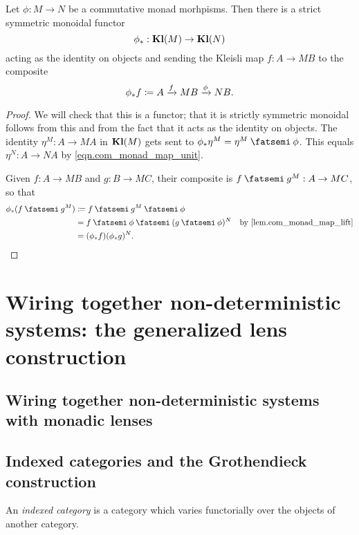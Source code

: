 \documentclass[DynamicalBook]{subfiles}
\begin{document}
\begin{proposition}
  Let $\phi : M \to N$ be a commutative monad morhpisms. Then there is a
  strict symmetric monoidal functor
  $$\phi_{\ast} : \textbf{Kl}(M) \to \textbf{Kl}(N)$$
  acting as the identity on objects and sending the Kleisli map $f : A \to MB$
  to the composite \[\phi_{\ast}f \coloneqq A \xrightarrow{f} M B \xrightarrow{\phi} N B.\]
\end{proposition}
\begin{proof}
  We will check that this is a functor; that it is strictly symmetric monoidal
  follows from this and from the fact that it acts as the identity on objects. 
  The identity $\eta^M : A \to M A$ in $\textbf{Kl}(M)$ gets sent to
  $\phi_{\ast}\eta^M = \eta^M \then \phi$. This equals $\eta^N : A \to NA$ by \cref{eqn.com_monad_map_unit}.

  Given $f : A \to MB$ and $g : B \to MC$, their composite is $f \then g^M : A
  \to M C$, so that
  \begin{align*}
    \phi_{\ast}(f \then g^M) &\coloneqq f \then g^M \then \phi \\
                             &= f \then \phi \then (g \then \phi)^N &\mbox{by \cref{lem.com_monad_map_lift}}\\
    &= (\phi_{\ast} f)(\phi_{\ast} g)^N.
  \end{align*} 
\end{proof}



\section[Wiring together non-deterministic systems]{Wiring together non-deterministic systems: the generalized lens construction}


\subsection{Wiring together non-deterministic systems with monadic lenses}

\subsection{Indexed categories and the Grothendieck construction}\label{sec.indexed_categories}

An \emph{indexed category} is a category which varies functorially over the
objects of another category.
\end{document}
